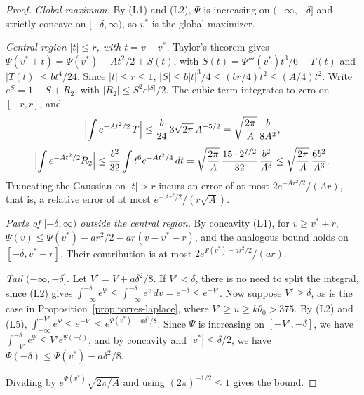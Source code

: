 \begin{proof}
\emph{Global maximum.} By (L1) and (L2), $\Psi$ is increasing on $(-\infty,-\delta]$ and strictly concave on
$[-\delta,\infty)$, so $v^*$ is the global maximizer.

\emph{Central region $|t|\le r$, with $t=v-v^*$.} Taylor's theorem gives
$\Psi(v^*+t)=\Psi(v^*)-At^2/2+S(t)$, with
$S(t)=\Psi'''(v^*)t^3/6+T(t)$ and $|T(t)|\le bt^4/24$. Since $|t|\le r\le1$,
$|S|\le b|t|^3/4\le(br/4)t^2\le(A/4)t^2$. Write $e^S=1+S+R_2$, with $|R_2|\le S^2e^{|S|}/2$. The cubic
term integrates to zero on $[-r,r]$, and
\[
 \Bigl|\int e^{-At^2/2}\,T\Bigr|\le\frac b{24}\,3\sqrt{2\pi}\,A^{-5/2}=\sqrt{\frac{2\pi}A}\,\frac b{8A^2},
\]
\[
 \Bigl|\int e^{-At^2/2}R_2\Bigr|\le\frac{b^2}{32}\int t^6e^{-At^2/4}\,dt
 =\sqrt{\frac{2\pi}A}\,\frac{15\cdot2^{7/2}}{32}\,\frac{b^2}{A^3}\le\sqrt{\frac{2\pi}A}\,\frac{6b^2}{A^3}.
\]
Truncating the Gaussian on $|t|>r$ incurs an error of at most $2e^{-Ar^2/2}/(Ar)$, that is, a relative error
of at
most $e^{-Ar^2/2}/(r\sqrt A)$.

\emph{Parts of $[-\delta,\infty)$ outside the central region.} By concavity (L1), for $v\ge v^*+r$,
$\Psi(v)\le\Psi(v^*)-ar^2/2-ar(v-v^*-r)$, and the analogous bound holds on $[-\delta,v^*-r]$. Their
contribution is at
most $2e^{\Psi(v^*)-ar^2/2}/(ar)$.

\emph{Tail $(-\infty,-\delta]$.} Let $V'=V+a\delta^2/8$. If $V'<\delta$, there is no need to split the
integral,
since (L2) gives $\int_{-\infty}^{-\delta}e^\Psi\le\int_{-\infty}^{-\delta}e^v\,dv=e^{-\delta}\le e^{-V'}$.
Now suppose $V'\ge\delta$, as is the case in Proposition~\ref{prop:torres-laplace}, where
$V'\ge u\ge k\theta_0>375$. By (L2) and (L5), $\int_{-\infty}^{-V'}e^\Psi\le e^{-V'}\le
e^{\Psi(v^*)-a\delta^2/8}$.
Since $\Psi$ is increasing on $[-V',-\delta]$, we have $\int_{-V'}^{-\delta}e^\Psi\le V'e^{\Psi(-\delta)}$,
and by
concavity and $|v^*|\le\delta/2$, we have $\Psi(-\delta)\le\Psi(v^*)-a\delta^2/8$.

Dividing by $e^{\Psi(v^*)}\sqrt{2\pi/A}$ and using $(2\pi)^{-1/2}\le1$ gives the bound.
\end{proof}
